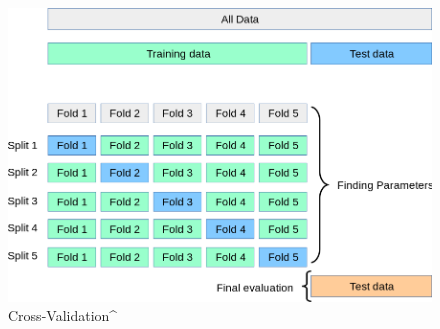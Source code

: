 \documentclass[12pt]{article}
\begin{document}
\begin{figure}[h]

\centering
\includegraphics[scale=0.5]{crossvalidation.png}
\caption{Cross-Validation^\cite{crossvalidation}}
\end{figure}


\FloatBarrier



%


\end{document}
